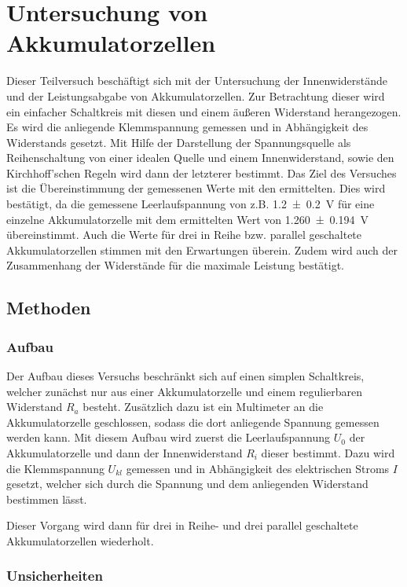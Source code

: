 \section{Untersuchung von Akkumulatorzellen} 

Dieser Teilversuch beschäftigt sich mit der Untersuchung der Innenwiderstände und der Leistungsabgabe von Akkumulatorzellen.
Zur Betrachtung dieser wird ein einfacher Schaltkreis mit diesen und einem äußeren Widerstand herangezogen.
Es wird die anliegende Klemmspannung gemessen und in Abhängigkeit des Widerstands gesetzt. 
Mit Hilfe der Darstellung der Spannungsquelle als Reihenschaltung von einer idealen Quelle und einem Innenwiderstand, sowie den Kirchhoff'schen Regeln wird dann der letzterer bestimmt. 
Das Ziel des Versuches ist die Übereinstimmung der gemessenen Werte mit den ermittelten. 
Dies wird bestätigt, da die gemessene Leerlaufspannung von z.B. \SI{1,2+-0,2}{V} für eine einzelne Akkumulatorzelle mit dem ermittelten Wert von \SI{1,260+-0,194}{V} übereinstimmt. Auch die Werte für drei in Reihe bzw. parallel geschaltete Akkumulatorzellen stimmen mit den Erwartungen überein.
Zudem wird auch der Zusammenhang der Widerstände für die maximale Leistung bestätigt.  

\subsection{Methoden}

\subsubsection{Aufbau}

Der Aufbau dieses Versuchs beschränkt sich auf einen simplen Schaltkreis, welcher zunächst nur aus einer Akkumulatorzelle und einem regulierbaren Widerstand $R_a$ besteht. 
Zusätzlich dazu ist ein Multimeter an die Akkumulatorzelle geschlossen, sodass die dort anliegende Spannung gemessen werden kann. 
Mit diesem Aufbau wird zuerst die Leerlaufspannung $U_0$ der Akkumulatorzelle und dann der Innenwiderstand $R_i$ dieser bestimmt.
Dazu wird die Klemmspannung $U_{kl}$ gemessen und in Abhängigkeit des elektrischen Stroms $I$ gesetzt, welcher sich durch die Spannung und dem anliegenden Widerstand bestimmen lässt.

Dieser Vorgang wird dann für drei in Reihe- und drei parallel geschaltete Akkumulatorzellen wiederholt. 

\subsubsection{Unsicherheiten}

